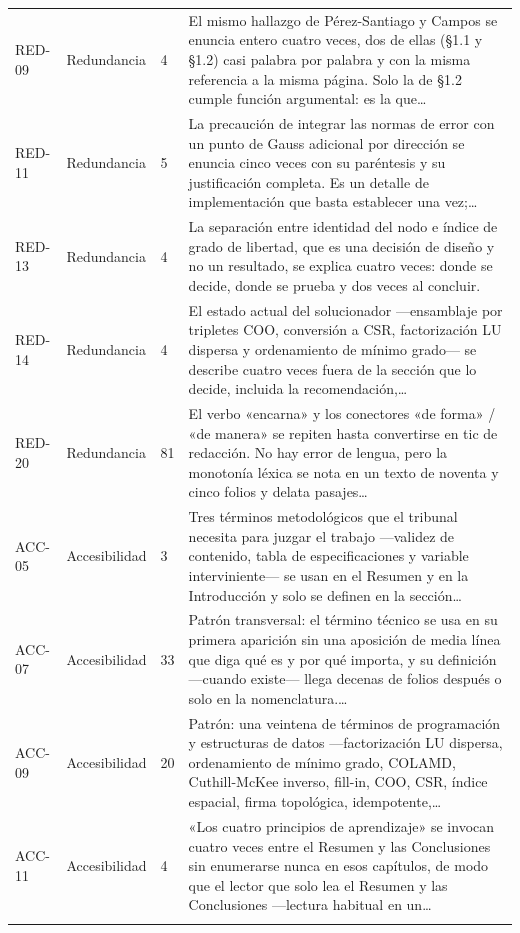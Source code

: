 {\begin{longtable}{@{}L{1.4cm}L{2.6cm}L{1.2cm}L{10.05cm}@{}}
RED-09 & Redundancia & 4 & El mismo hallazgo de Pérez-Santiago y Campos se enuncia entero cuatro veces, dos de ellas (§1.1 y §1.2) casi palabra por palabra y con la misma referencia a la misma página. Solo la de §1.2 cumple función argumental: es la que…\\\addlinespace[2pt]
RED-11 & Redundancia & 5 & La precaución de integrar las normas de error con un punto de Gauss adicional por dirección se enuncia cinco veces con su paréntesis y su justificación completa. Es un detalle de implementación que basta establecer una vez;…\\\addlinespace[2pt]
RED-13 & Redundancia & 4 & La separación entre identidad del nodo e índice de grado de libertad, que es una decisión de diseño y no un resultado, se explica cuatro veces: donde se decide, donde se prueba y dos veces al concluir.\\\addlinespace[2pt]
RED-14 & Redundancia & 4 & El estado actual del solucionador —ensamblaje por tripletes COO, conversión a CSR, factorización LU dispersa y ordenamiento de mínimo grado— se describe cuatro veces fuera de la sección que lo decide, incluida la recomendación,…\\\addlinespace[2pt]
RED-20 & Redundancia & 81 & El verbo «encarna» y los conectores «de forma» /\allowbreak{} «de manera» se repiten hasta convertirse en tic de redacción. No hay error de lengua, pero la monotonía léxica se nota en un texto de noventa y cinco folios y delata pasajes…\\\addlinespace[2pt]
ACC-05 & Accesibilidad & 3 & Tres términos metodológicos que el tribunal necesita para juzgar el trabajo —validez de contenido, tabla de especificaciones y variable interviniente— se usan en el Resumen y en la Introducción y solo se definen en la sección…\\\addlinespace[2pt]
ACC-07 & Accesibilidad & 33 & Patrón transversal: el término técnico se usa en su primera aparición sin una aposición de media línea que diga qué es y por qué importa, y su definición —cuando existe— llega decenas de folios después o solo en la nomenclatura.…\\\addlinespace[2pt]
ACC-09 & Accesibilidad & 20 & Patrón: una veintena de términos de programación y estructuras de datos —factorización LU dispersa, ordenamiento de mínimo grado, COLAMD, Cuthill-McKee inverso, fill-in, COO, CSR, índice espacial, firma topológica, idempotente,…\\\addlinespace[2pt]
ACC-11 & Accesibilidad & 4 & «Los cuatro principios de aprendizaje» se invocan cuatro veces entre el Resumen y las Conclusiones sin enumerarse nunca en esos capítulos, de modo que el lector que solo lea el Resumen y las Conclusiones —lectura habitual en un…\\\addlinespace[2pt]

\end{longtable}}
